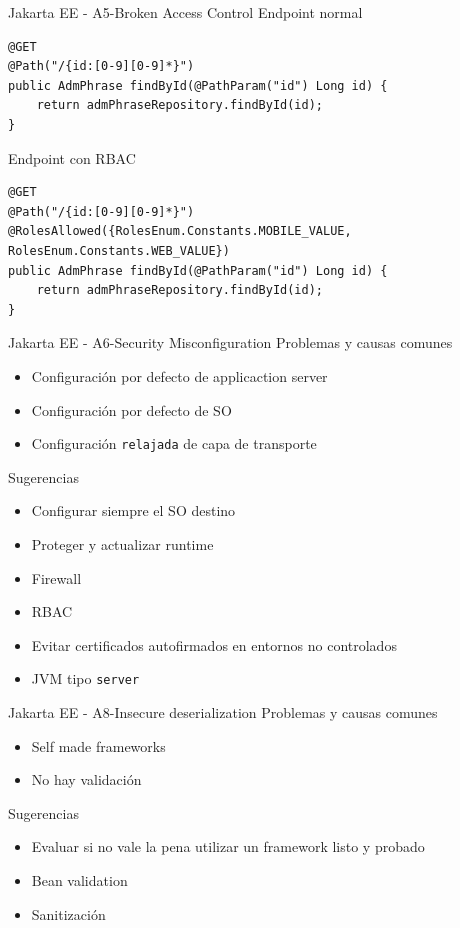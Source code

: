 \documentclass[aspectratio=169]{beamer}
\begin{document}
\begin{frame}[fragile]{Jakarta EE - A5-Broken Access Control}
Endpoint normal
\begin{lstlisting}
@GET
@Path("/{id:[0-9][0-9]*}")
public AdmPhrase findById(@PathParam("id") Long id) {
    return admPhraseRepository.findById(id);
}
\end{lstlisting}

Endpoint con RBAC
\begin{lstlisting}
@GET
@Path("/{id:[0-9][0-9]*}")
@RolesAllowed({RolesEnum.Constants.MOBILE_VALUE, RolesEnum.Constants.WEB_VALUE})
public AdmPhrase findById(@PathParam("id") Long id) {
    return admPhraseRepository.findById(id);
}
\end{lstlisting}

\end{frame}




\begin{frame}{Jakarta EE - A6-Security Misconfiguration}
    Problemas y causas comunes
    \begin{itemize}
        \item Configuración por defecto de applicaction server
        \item Configuración por defecto de SO
        \item Configuración \texttt{relajada} de capa de transporte
    \end{itemize}

    Sugerencias
    \begin{itemize}
        \item Configurar siempre el SO destino
        \item Proteger y actualizar runtime
        \item Firewall
        \item RBAC
        \item Evitar certificados autofirmados en entornos no controlados
        \item JVM tipo \texttt{server}
    \end{itemize}
\end{frame}


\begin{frame}{Jakarta EE - A8-Insecure deserialization}
    Problemas y causas comunes
    \begin{itemize}
        \item Self made frameworks
        \item No hay validación
    \end{itemize}

    Sugerencias
    \begin{itemize}
        \item Evaluar si no vale la pena utilizar un framework listo y probado
        \item Bean validation
        \item Sanitización
    \end{itemize}
\end{frame}
\end{document}

